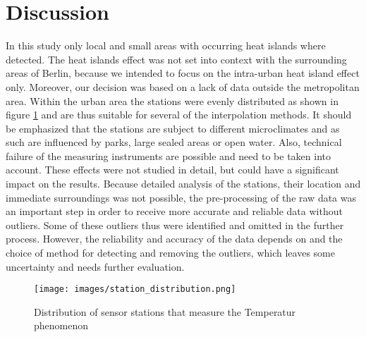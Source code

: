 
\section{Discussion}

In this study only local and small areas with occurring heat islands where detected. The \ldq{}heat islands effect\rdq{} was not set into context with the surrounding areas of Berlin, because we intended to focus on the intra-urban heat island effect only. Moreover, our decision was based on a lack of data outside the metropolitan area. Within the urban area the stations were evenly distributed as shown in figure \ref{fig:station_dsitribution} and are thus suitable for several of the interpolation methods. It should be emphasized that the stations are subject to different microclimates and as such are influenced by parks, large sealed areas or open water. \cite{chowienczyk_estimating_2020} Also, technical failure of the measuring instruments are possible and need to be taken into account. These effects were not studied in detail, but could have a significant impact on the results. Because detailed analysis of the stations, their location and immediate surroundings was not possible, the pre-processing of the raw data was an important step in order to receive more accurate and reliable data without outliers. Some of these outliers thus were identified and omitted in the further process. However, the reliability and accuracy of the data depends on and the choice of method for detecting and removing the outliers, which leaves some uncertainty and needs further evaluation. 



\begin{figure}[H]
	\centering
	\texttt{[image: images/station\_distribution.png]}
	\caption{Distribution of sensor stations that measure the \ldq{}Temperatur\rdq{} phenomenon}
	\label{fig:station_dsitribution}
\end{figure}
